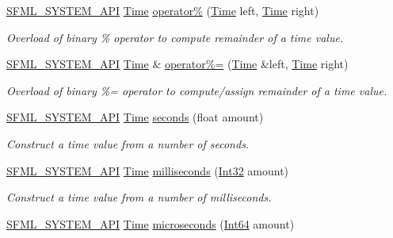 \begin{DoxyCompactItemize}
\hyperlink{sfml_2dep_2_s_f_m_l-2_84_82_2include_2_s_f_m_l_2_system_2_export_8hpp_a6476c9e422606477a4c23d92b1d79a1f}{S\-F\-M\-L\-\_\-\-S\-Y\-S\-T\-E\-M\-\_\-\-A\-P\-I} \hyperlink{classsf_1_1_time}{Time} \hyperlink{classsf_1_1_time_aafb8b12fb0ac0e366d6ea9c9e9f93335}{operator\%} (\hyperlink{classsf_1_1_time}{Time} left, \hyperlink{classsf_1_1_time}{Time} right)
\begin{DoxyCompactList}\small\item\em Overload of binary \% operator to compute remainder of a time value. \end{DoxyCompactList}\item 
\hyperlink{sfml_2dep_2_s_f_m_l-2_84_82_2include_2_s_f_m_l_2_system_2_export_8hpp_a6476c9e422606477a4c23d92b1d79a1f}{S\-F\-M\-L\-\_\-\-S\-Y\-S\-T\-E\-M\-\_\-\-A\-P\-I} \hyperlink{classsf_1_1_time}{Time} \& \hyperlink{classsf_1_1_time_af12dd271f14a17b58c9d737395e776d4}{operator\%=} (\hyperlink{classsf_1_1_time}{Time} \&left, \hyperlink{classsf_1_1_time}{Time} right)
\begin{DoxyCompactList}\small\item\em Overload of binary \%= operator to compute/assign remainder of a time value. \end{DoxyCompactList}\item 
\hyperlink{sfml_2dep_2_s_f_m_l-2_84_82_2include_2_s_f_m_l_2_system_2_export_8hpp_a6476c9e422606477a4c23d92b1d79a1f}{S\-F\-M\-L\-\_\-\-S\-Y\-S\-T\-E\-M\-\_\-\-A\-P\-I} \hyperlink{classsf_1_1_time}{Time} \hyperlink{classsf_1_1_time_ae36b9ef700f0ed0516abf0194ceb546b}{seconds} (float amount)
\begin{DoxyCompactList}\small\item\em Construct a time value from a number of seconds. \end{DoxyCompactList}\item 
\hyperlink{sfml_2dep_2_s_f_m_l-2_84_82_2include_2_s_f_m_l_2_system_2_export_8hpp_a6476c9e422606477a4c23d92b1d79a1f}{S\-F\-M\-L\-\_\-\-S\-Y\-S\-T\-E\-M\-\_\-\-A\-P\-I} \hyperlink{classsf_1_1_time}{Time} \hyperlink{classsf_1_1_time_ae379d420bc07170668f51522023957b9}{milliseconds} (\hyperlink{namespacesf_ac2dfd4952377a26dee4750e2e4a30a15}{Int32} amount)
\begin{DoxyCompactList}\small\item\em Construct a time value from a number of milliseconds. \end{DoxyCompactList}\item 
\hyperlink{sfml_2dep_2_s_f_m_l-2_84_82_2include_2_s_f_m_l_2_system_2_export_8hpp_a6476c9e422606477a4c23d92b1d79a1f}{S\-F\-M\-L\-\_\-\-S\-Y\-S\-T\-E\-M\-\_\-\-A\-P\-I} \hyperlink{classsf_1_1_time}{Time} \hyperlink{classsf_1_1_time_a951fd7219641f1e8191887f5dfe0dc31}{microseconds} (\hyperlink{namespacesf_a2840579fed3494d9f330baf7a5a19903}{Int64} amount)

\end{DoxyCompactItemize}
